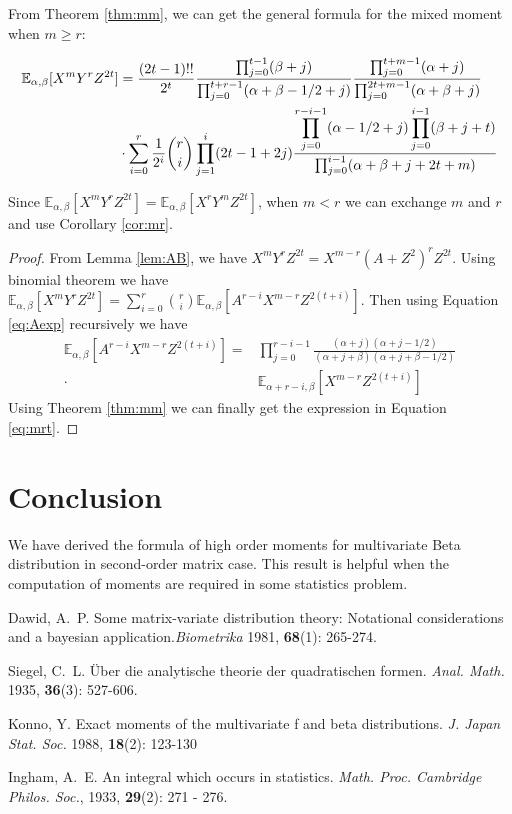 \documentclass[twoside]{article}%
\def\E{\mathbb{E}}
\begin{document}
From Theorem \ref{thm:mm},
we can get
the general formula for the mixed moment when $m\geq r$:
\begin{corollary}\label{cor:mr}
\begin{align}
\E_{\alpha, \beta}[X^mY^rZ^{2t}] &= \frac{(2t-1)!!}{2^t}
\frac{\prod_{j=0}^{t-1} (\beta+j)}{\prod_{j=0}^{t+r-1} (\alpha+\beta-1/2+j)}
\frac{\prod_{j=0}^{t+m-1}(\alpha+j)}{\prod_{j=0}^{2t+m-1} (\alpha+\beta+j)}\notag\\
&\cdot\sum_{i=0}^r \frac{1}{2^i}\binom{r}{i}\prod_{j=1}^i (2t-1+2j)
\frac{\displaystyle\prod_{j=0}^{r-i-1}(\alpha-1/2+j)
\prod_{j=0}^{i-1}(\beta+j+t)}{\prod_{j=0}^{i-1}(\alpha+\beta+j+2t+m)}
\label{eq:mrt}
\end{align}
\end{corollary}
Since $\E_{\alpha, \beta}[X^mY^rZ^{2t}]=\E_{\alpha, \beta}[X^rY^mZ^{2t}]$, 
when $m<r$ we can exchange $m$ and $r$ and use Corollary \ref{cor:mr}.
\begin{proof}
From Lemma \ref{lem:AB}, we have
$X^m Y^r Z^{2t} = X^{m-r}(A+Z^2)^r Z^{2t} $.
Using binomial theorem we have
$\E_{\alpha, \beta}[X^m Y^r Z^{2t}] = \sum_{i=0}^r \binom{r}{i}\E_{\alpha, \beta}
[A^{r-i}X^{m-r}Z^{2(t+i)}]$. Then using Equation \eqref{eq:Aexp} recursively
we have 
\begin{align*}
\E_{\alpha, \beta}
[A^{r-i}X^{m-r}Z^{2(t+i)}] =&
\prod_{j=0}^{r-i-1}\frac{(\alpha+j)(\alpha+j-1/2)}
{(\alpha+j+\beta)(\alpha+j+\beta-1/2)} \\
\cdot & \E_{\alpha+r-i, \beta}
[X^{m-r}Z^{2(t+i)}]
\end{align*}
Using Theorem \ref{thm:mm} we can finally get the expression in
Equation \eqref{eq:mrt}.
\end{proof}
\section{Conclusion}
We have derived the formula of high order moments for multivariate Beta distribution
in second-order matrix case. This result is helpful when the computation of moments
are required in some statistics problem.

\begin{thebibliography}{stringX}
\leftskip=-8mm
\parskip=-1mm
\small

 Dawid, A.~P. Some matrix-variate distribution theory: Notational
  considerations and a bayesian application.{\it Biometrika} 1981, {\bf 68}(1): 265-274.

 Siegel, C.~L. Über die analytische theorie der quadratischen formen.
  {\it Anal. Math.} 1935, {\bf 36}(3): 527-606.

 Konno, Y. Exact moments of the multivariate f and beta distributions.
{\it J. Japan Stat. Soc.} 1988, {\bf 18}(2): 123-130

 Ingham, A.~E. An integral which occurs in statistics. {\it Math. Proc. Cambridge Philos. Soc.}, 1933, {\bf 29}(2): 271 - 276.   %

\end{thebibliography}

\end{document}
